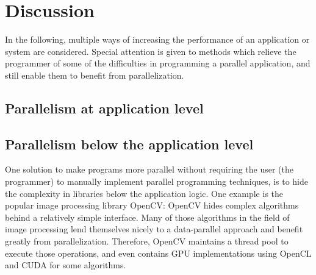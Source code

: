 \documentclass[BCOR20mm,DIV14,10pt,headinclude,footexclude,bibtotoc,liststotoc]{article}
\begin{document}
\section{Discussion}

In the following, multiple ways of increasing the performance of an application
or system are considered. Special attention is given to methods which relieve
the programmer of some of the difficulties in programming a parallel
application, and still enable them to benefit from parallelization.



\subsection{Parallelism at application level}

\subsection{Parallelism below the application level}
One solution to make programs more parallel without requiring the user (the
programmer) to manually implement parallel programming techniques, is to hide
the complexity in libraries below the application logic. One example is the
popular image processing library OpenCV: OpenCV hides complex algorithms behind
a relatively simple interface. Many of those algorithms in the field of image
processing lend themselves nicely to a data-parallel approach and benefit
greatly from parallelization. Therefore, OpenCV maintains a thread pool to
execute those operations, and even contains GPU implementations using OpenCL and
CUDA for some algorithms.
\end{document}
